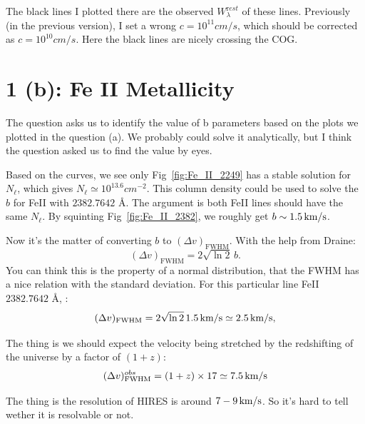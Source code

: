 \documentclass[12pt,letterpaper]{article}
\newcommand{\mt}{\mathrm}
\newcommand{\EWrest}{W^{\mt rest}_\lambda}
\newcommand{\kms}{\textrm{\,km/s}}
\newcommand{\dvfwhm}{(\Delta v)_{\textrm{FWHM}}}
\begin{document}
The black lines I plotted there are the observed $\EWrest$ of these lines.
Previously (in the previous version), I set a wrong $c=10^{11} cm/s$, which should be corrected as $c = 10^{10} cm/s$.
Here the black lines are nicely crossing the COG.

\section*{1 (b): Fe II Metallicity}
The question asks us to identify the value of b parameters based on the plots we plotted in the question (a).
We probably could solve it analytically, but I think the question asked us to find the value by eyes.

Based on the curves, we see only Fig~\ref{fig:Fe_II_2249} has a stable solution for $N_\ell$, which gives $N_\ell \simeq 10^{13.6} cm^{-2}$.
This column density could be used to solve the $b$ for FeII with $2382.7642$ \AA.
The argument is both FeII lines should have the same $N_\ell$.
By squinting Fig~\ref{fig:Fe_II_2382}, we roughly get $b\sim1.5\kms$.

Now it's the matter of converting $b$ to $\dvfwhm$.
With the help from Draine:
\begin{equation}
    \dvfwhm = 2 \sqrt{\ln{2}}\, b.
\end{equation}
You can think this is the property of a normal distribution, that the FWHM has a nice relation with the standard deviation.
For this particular line FeII $2382.7642$ \AA, :
\begin{equation*}
    \dvfwhm = 2 \sqrt{\ln 2} \, 1.5 \kms \simeq 2.5\kms,
\end{equation*}

The thing is we should expect the velocity being stretched by the redshifting of the universe by a factor of $(1 + z)$:
\begin{equation}
        \dvfwhm^{obs}  = (1+z) \times 17 \simeq 7.5 \kms
\end{equation}

The thing is the resolution of HIRES is around $7-9 \kms$.
So it's hard to tell wether it is resolvable or not.
\end{document}
